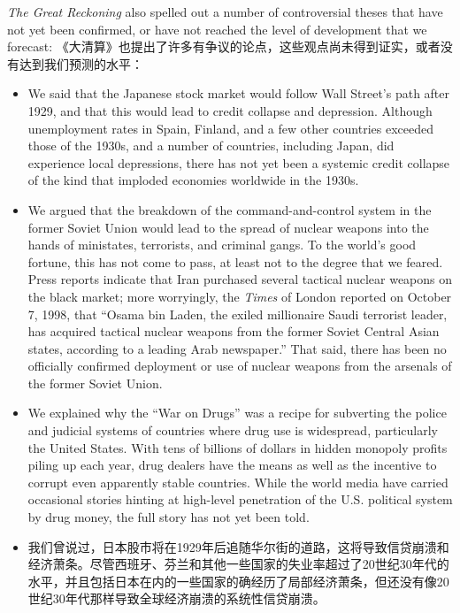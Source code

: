\begin{paracol}{2}
	\switchcolumn*
	\emph{The Great Reckoning} also spelled out a number of controversial theses that have not yet been confirmed, or have not reached the level of development that we forecast:
	\switchcolumn
	《大清算》也提出了许多有争议的论点，这些观点尚未得到证实，或者没有达到我们预测的水平：
	\switchcolumn*
	\begin{itemize}
		\item We said that the Japanese stock market would follow Wall Street's path after 1929, and that this would lead to credit collapse and depression. Although unemployment rates in Spain, Finland, and a few other countries exceeded those of the 1930s, and a number of countries, including Japan, did experience local depressions, there has not yet been a systemic credit collapse of the kind that imploded economies worldwide in the 1930s.
		\item We argued that the breakdown of the command-and-control system in the former Soviet Union would lead to the spread of nuclear weapons into the hands of ministates, terrorists, and criminal gangs. To the world's good fortune, this has not come to pass, at least not to the degree that we feared. Press reports indicate that Iran purchased several tactical nuclear weapons on the black market; more worryingly, the \emph{Times} of London reported on October 7, 1998, that ``Osama bin Laden, the exiled millionaire Saudi terrorist leader, has acquired tactical nuclear weapons from the former Soviet Central Asian states, according to a leading Arab newspaper.'' That said, there has been no officially confirmed deployment or use of nuclear weapons from the arsenals of the former Soviet Union.
		\item We explained why the ``War on Drugs'' was a recipe for subverting the police and judicial systems of countries where drug use is widespread, particularly the United States. With tens of billions of dollars in hidden monopoly profits piling up each year, drug dealers have the means as well as the incentive to corrupt even apparently stable countries. While the world media have carried occasional stories hinting at high-level penetration of the U.S. political system by drug money, the full story has not yet been told.
	\end{itemize}
	\switchcolumn
	\begin{itemize}
		\item 我们曾说过，日本股市将在1929年后追随华尔街的道路，这将导致信贷崩溃和经济萧条。尽管西班牙、芬兰和其他一些国家的失业率超过了20世纪30年代的水平，并且包括日本在内的一些国家的确经历了局部经济萧条，但还没有像20世纪30年代那样导致全球经济崩溃的系统性信贷崩溃。

\end{itemize}
\end{paracol}
